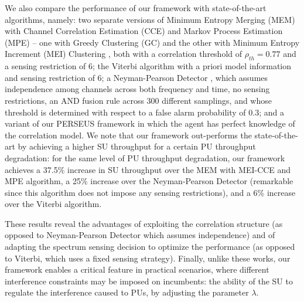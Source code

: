 \documentclass[10pt,twocolumn]{IEEEtran}
\begin{document}
We also compare the performance of our framework with state-of-the-art algorithms, namely: two separate versions of Minimum Entropy Merging (MEM) with Channel Correlation Estimation (CCE) and Markov Process Estimation (MPE) -- one with Greedy Clustering (GC) and the other with Minimum Entropy Increment (MEI) Clustering \cite{6956794}, both with a correlation threshold of $\rho_{th}{=}0.77$ and a sensing restriction of $6$; the Viterbi algorithm \cite{4554696} with a priori model information and sensing restriction of $6$; a Neyman-Pearson Detector \cite{5167826}, which assumes independence among channels across both frequency and time, no sensing restrictions, an AND fusion rule across 300 different samplings, and whose threshold is determined with respect to a false alarm probability of $0.3$; and a variant of our PERSEUS framework in which the agent has perfect knowledge of the correlation model. We note that our framework out-performs the state-of-the-art by achieving a higher SU throughput for a certain PU throughput degradation: for the same level of PU throughput degradation, our framework achieves a 37.5\% increase in SU throughput over the MEM with MEI-CCE and MPE algorithm, a 25\% increase over the Neyman-Pearson Detector (remarkable since this algorithm does not impose any sensing restrictions), and a 6\% increase over the Viterbi algorithm. 

These results reveal the advantages of exploiting the correlation structure (as opposed to Neyman-Pearson Detector which assumes independence) and of adapting the spectrum sensing decision to optimize the performance (as opposed to Viterbi, which uses a fixed sensing strategy). Finally, unlike these works, our framework enables a critical feature in practical scenarios, where different interference constraints may be imposed on incumbents: the ability of the SU to regulate the interference caused to PUs, by adjusting the parameter $\lambda$.
\vspace{-5mm}
\end{document}
